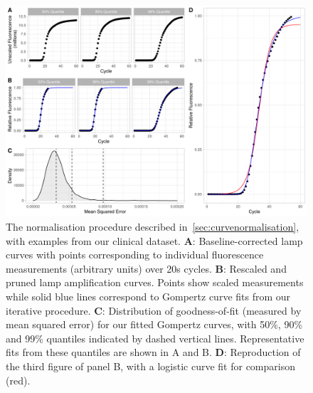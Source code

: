 \documentclass[../thesis.tex]{subfiles}
\begin{document}
\begin{figure}[!tpb] 
\centering
\includegraphics[width=6in]{../figures/chapter2/paper_gomp_quality_fig.png}
\caption{The normalisation procedure described in~\ref{sec:curvenormalisation}, with examples from our clinical dataset. \textbf{A}: Baseline-corrected \gls{lamp} curves with points corresponding to individual fluorescence measurements (arbitrary units) over 20s cycles. \textbf{B}: Rescaled and pruned \gls{lamp} amplification curves. Points show scaled measurements while solid blue lines correspond to Gompertz curve fits from our iterative procedure. \textbf{C}: Distribution of goodness-of-fit (measured by mean squared error) for our fitted Gompertz curves, with 50\%, 90\% and 99\% quantiles indicated by dashed vertical lines. Representative fits from these quantiles are shown in {A} and {B}. \textbf{D}: Reproduction of the third figure of panel {B}, with a logistic curve fit for comparison (red).  \label{fig:gompertz_fit}}
\end{figure}
\end{document}
